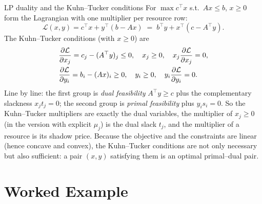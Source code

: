 \begin{rulebox}{LP duality and the Kuhn--Tucker conditions}
For $\max c^{\top}x$ s.t.\ $Ax\le b$, $x\ge 0$ form the Lagrangian with one
multiplier per resource row:
\[
  \mathcal{L}(x,y)=c^{\top}x+y^{\top}(b-Ax)
  \;=\;b^{\top}y+x^{\top}(c-A^{\top}y).
\]
The Kuhn--Tucker conditions (with $x\ge 0$) are
\[
  \begin{aligned}
    &\frac{\partial \mathcal{L}}{\partial x_{j}}=c_{j}-(A^{\top}y)_{j}\le 0,\quad x_{j}\ge 0,\quad
     x_{j}\frac{\partial \mathcal{L}}{\partial x_{j}}=0,\\
    &\frac{\partial \mathcal{L}}{\partial y_{i}}=b_{i}-(Ax)_{i}\ge 0,\quad y_{i}\ge 0,\quad
     y_{i}\frac{\partial \mathcal{L}}{\partial y_{i}}=0 .
  \end{aligned}
\]
Line by line: the first group is \emph{dual feasibility} $A^{\top}y\ge c$
plus the complementary slackness $x_{j}t_{j}=0$; the second group is
\emph{primal feasibility} plus $y_{i}s_{i}=0$. So the Kuhn--Tucker
multipliers are exactly the dual variables, the multiplier of $x_{j}\ge 0$
(in the version with explicit $\mu_{j}$) is the dual slack $t_{j}$, and the
multiplier of a resource is its shadow price. Because the objective and the
constraints are linear (hence concave and convex), the Kuhn--Tucker
conditions are not only necessary but also sufficient: a pair $(x,y)$
satisfying them is an optimal primal--dual pair.
\end{rulebox}

\section{Worked Example}

